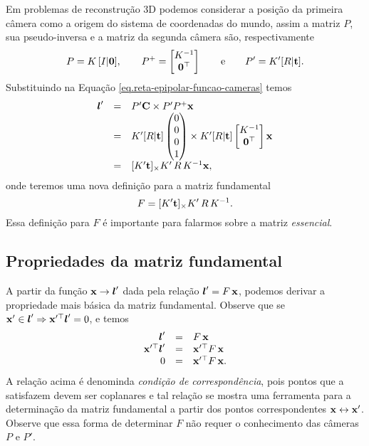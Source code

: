 Em problemas de reconstrução 3D podemos considerar a posição da primeira câmera como a origem do sistema de coordenadas do mundo, assim a matriz $P$, sua pseudo-inversa e a matriz da segunda câmera são, respectivamente 
\begin{equation*}
P=K\,[I|{\bf 0}],\qquad
P^+=
\begin{bmatrix}
K^{-1}\\
{\bf 0}^\top
\end{bmatrix}\qquad\text{e}\qquad
P'=K'[R|{\bf t}].
\end{equation*}
Substituindo na Equação \ref{eq.reta-epipolar-funcao-cameras} temos
\begin{equation*}
\begin{array}{rcl}
\boldsymbol{l}'&=&P'{\bf C} \times P'P^+\mathbf{x}\\
&=&K'[R|{\bf t}]
\begin{pmatrix}
0\\
0\\
0\\
1
\end{pmatrix}
\times K'[R|{\bf t}]
\begin{bmatrix}
K^{-1}\\
{\bf 0}^\top
\end{bmatrix}\mathbf{x}\\
&=&
[K'{\bf t}]_\times K'\,R\,K^{-1}\mathbf{x},
\end{array}
\end{equation*}
onde teremos uma nova definição para a matriz fundamental 
\begin{equation}\label{eq.definicao-F}
F=[K'{\bf t}]_\times K'\,R\,K^{-1}.
\end{equation}
Essa definição para $F$ é importante para falarmos sobre a matriz {\it essencial}.
\subsection{Propriedades da matriz fundamental}\label{sec.propriedades-F}
A partir da função $\mathbf{x}\rightarrow\boldsymbol{l}'$ dada pela relação $\boldsymbol{l}'=F\,\mathbf{x}$, podemos derivar a propriedade mais básica da matriz fundamental.
Observe que se $\mathbf{x}'\in\boldsymbol{l}'\Rightarrow\mathbf{x}'^\top\boldsymbol{l}'=0$, e temos
\begin{equation*}
\begin{array}{rcl}
\boldsymbol{l}'&=&F\,\mathbf{x}\\
\mathbf{x}'^\top\boldsymbol{l}'&=&\mathbf{x}'^\top F\,\mathbf{x}\\
0&=&\mathbf{x}'^\top F\,\mathbf{x}.
\end{array}
\end{equation*}
A relação acima é denominda {\it condição de correspondência}, pois pontos que a satisfazem devem ser  coplanares e tal relação se mostra uma ferramenta para a determinação da matriz fundamental a partir dos pontos correspondentes $\mathbf{x}\leftrightarrow\mathbf{x}'$. Observe que essa forma de determinar $F$ não requer o conhecimento das câmeras $P$ e $P'$. 

